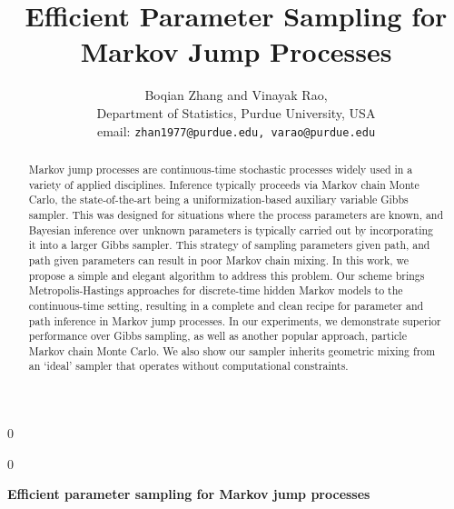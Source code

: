 \documentclass[12pt]{article}
\newcommand{\blind}{0}
\begin{document}
%

\def\spacingset#1{\renewcommand{\baselinestretch}%
{#1}\small\normalsize} \spacingset{1}



\blind
{
  \title{\bf Efficient Parameter Sampling for Markov Jump Processes}
  \author{Boqian Zhang and Vinayak Rao, \\
          Department of Statistics, Purdue University, USA \\
          email: \texttt{zhan1977@purdue.edu, varao@purdue.edu}
  }
  \maketitle
} \fi

\blind
{
  \bigskip
  \bigskip
  \bigskip
  \begin{center}
    {\LARGE\bf Efficient parameter sampling for Markov jump processes}
\end{center}
  \medskip
} \fi

\bigskip
\begin{abstract}
Markov jump processes  are continuous-time stochastic processes 
widely used in a variety of applied disciplines. Inference typically
proceeds via Markov chain Monte Carlo, the state-of-the-art being a 
uniformization-based auxiliary
variable Gibbs sampler. This was
designed for situations where the process parameters are known, and Bayesian
inference over unknown parameters is typically carried out by incorporating
it into a larger Gibbs sampler.
This strategy of sampling parameters given path, and
path given parameters can result in poor Markov chain mixing. In this
work, we propose a simple and elegant algorithm to address this
problem. Our scheme brings Metropolis-Hastings approaches
for discrete-time hidden Markov models to the continuous-time
setting, %
resulting in %
 a complete and clean recipe for
parameter and path inference in Markov jump processes. In our experiments, we
demonstrate superior performance over Gibbs sampling, as well as
another popular approach, particle Markov chain Monte Carlo.
We also show our sampler inherits geometric mixing from an `ideal' 
sampler that operates without computational constraints.
\end{abstract}
\end{document}
